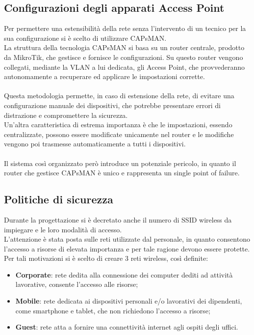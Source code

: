 \documentclass[Realizzazione.tex]{subfiles}
\begin{document}
\subsection{Configurazioni degli apparati Access Point}
Per permettere una estensibilità della rete senza l'intervento di un tecnico per la sua configurazione si è scelto di utilizzare CAPsMAN. \\
La struttura della tecnologia CAPsMAN si basa su un router centrale, prodotto da MikroTik, che gestisce e fornisce le configurazioni. Su questo router vengono collegati, mediante la VLAN a lui dedicata, gli Access Point, che provvederanno autonomamente a recuperare ed applicare le impostazioni corrette. \\\\
Questa metodologia permette, in caso di estensione della rete, di evitare una configurazione manuale dei dispositivi, che potrebbe presentare errori di distrazione e compromettere la sicurezza. \\
Un'altra caratteristica di estrema importanza è che le impostazioni, essendo centralizzate, possono essere modificate unicamente nel router e le modifiche vengono poi trasmesse automaticamente a tutti i dispositivi. \\\\
Il sistema così organizzato però introduce un potenziale pericolo, in quanto il router che gestisce CAPsMAN è unico e rappresenta un single point of failure.

\newpage
\subsection{Politiche di sicurezza}
Durante la progettazione si è decretato anche il numero di SSID wireless da impiegare e le loro modalità di accesso. \\
L'attenzione è stata posta sulle reti utilizzate dal personale, in quanto consentono l'accesso a risorse di elevata importanza e per tale ragione devono essere protette. \\
Per tali motivazioni si è scelto di creare 3 reti wireless, così definite:
\begin{itemize}
	\item \textbf{Corporate}: rete dedita alla connessione dei computer dediti ad attività lavorative, consente l'accesso alle risorse;
	\item \textbf{Mobile}: rete dedicata ai dispositivi personali e/o lavorativi dei dipendenti, come smartphone e tablet, che non richiedono l'accesso a risorse;
	\item \textbf{Guest}: rete atta a fornire una connettività internet agli ospiti degli uffici.
\end{itemize}
\end{document}
